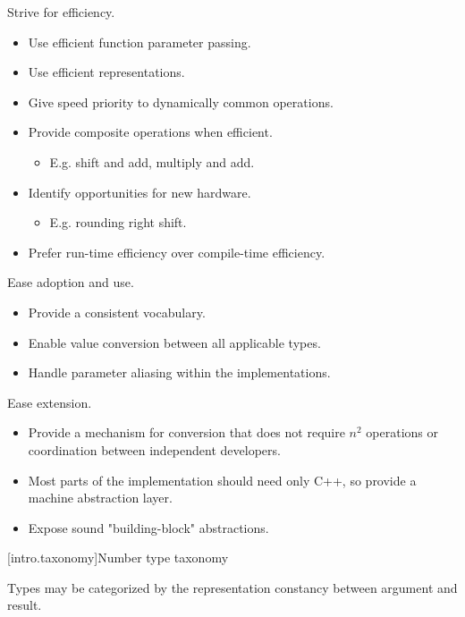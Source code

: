 Strive for efficiency.

\begin{itemize}
\item Use efficient function parameter passing.
\item Use efficient representations.
\item Give speed priority to dynamically common operations.
\item Provide composite operations when efficient.
\begin{itemize}
\item E.g. shift and add, multiply and add.
\end{itemize}
\item Identify opportunities for new hardware.
\begin{itemize}
\item E.g. rounding right shift.
\end{itemize}
\item Prefer run-time efficiency over compile-time efficiency.
\end{itemize}

Ease adoption and use.

\begin{itemize}
\item Provide a consistent vocabulary.
\item Enable value conversion between all applicable types.
\item Handle parameter aliasing within the implementations.
\end{itemize}

Ease extension.

\begin{itemize}
\item Provide a mechanism for conversion that does not require $n^{2}$ operations or coordination between independent developers.
\item Most parts of the implementation should need only C++, so provide a machine abstraction layer.
\item Expose sound "building-block" abstractions.
\end{itemize}

[intro.taxonomy]{Number type taxonomy}

Types may be categorized by the representation constancy between argument and result.

